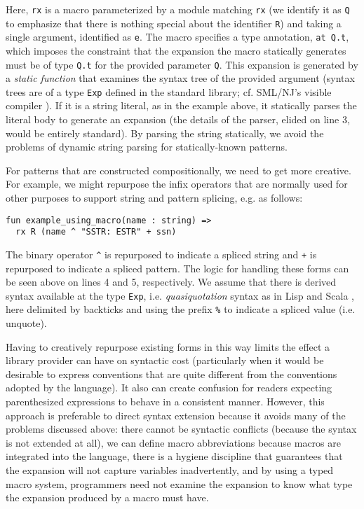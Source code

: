 Here, \lstinline{rx} is a macro parameterized by a module matching \lstinline{rx} (we identify it as \lstinline{Q} to emphasize that there is nothing special about the identifier \lstinline{R}) and taking a single argument, identified as \lstinline{e}. The macro specifies a type annotation, \lstinline{at Q.t}, which imposes the constraint that the expansion the macro statically generates must be of type \lstinline{Q.t} for the provided parameter \lstinline{Q}. This expansion is generated by a \emph{static function} that examines the syntax tree of the provided argument (syntax trees are of a type \lstinline{Exp} defined in the standard library; cf. SML/NJ's visible compiler \cite{SML/VisibleCompiler}). If it is a string literal, as in the example above, it statically parses the literal body to generate an expansion (the details of the parser, elided on line 3, would be entirely standard). 
By parsing the string statically, we avoid the problems of dynamic string parsing for statically-known patterns. 

For patterns that are constructed compositionally, we need to get more creative. For example, we might repurpose the infix operators that are normally used for other purposes to support string and pattern splicing, e.g. as follows:

\begin{lstlisting}[numbers=none,escapechar=|]
fun example_using_macro(name : string) => 
  rx R (name ^ "SSTR: ESTR" + ssn)
\end{lstlisting}

The binary operator \lstinline{^} is repurposed to indicate a spliced string and \lstinline{+} is repurposed to indicate a spliced pattern. The logic for handling these forms can be seen above on lines 4 and 5, respectively. We assume that there is derived syntax available at the type \lstinline{Exp}, i.e. \emph{quasiquotation} syntax as in Lisp \cite{Bawd99a} and Scala \cite{shabalin2013quasiquotes}, here delimited by backticks and using the prefix \lstinline{%} to indicate a spliced value (i.e. unquote). 

Having to creatively repurpose existing forms in this way limits the effect a library provider can have on syntactic cost (particularly when it would be desirable to express conventions that are quite different from the conventions adopted by the language). It also can create confusion for readers expecting parenthesized expressions to behave in a consistent manner. However,  this approach is preferable to direct syntax extension because it avoids many of the problems discussed above: there cannot be syntactic conflicts (because the syntax is not extended at all), we can define macro abbreviations because macros are integrated into the language, there is a hygiene discipline that guarantees that the expansion will not capture variables inadvertently, and by using a typed macro system, programmers need not examine the expansion to know what type the expansion produced by a macro must have. 

